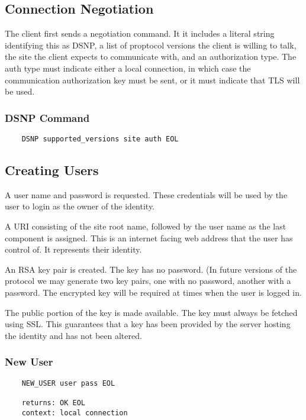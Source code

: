 \documentclass[letterpaper,11pt,oneside]{article}
\begin{document}
\subsection{Connection Negotiation}

The client first sends a negotiation command. It it includes a literal string
identifying this as DSNP, a list of proptocol versions the client is willing to
talk, the site the client expects to communicate with, and an authorization
type. The auth type must indicate either a local connection, in which case the
communication authorization key must be sent, or it must indicate that TLS will
be used.

\subsubsection{DSNP Command}

\vspace{10pt}
\begin{verbatim}
    DSNP supported_versions site auth EOL
\end{verbatim}

\subsection{Creating Users}

\vspace{10pt}
A user name and password is requested. These credentials will be used by the
user to login as the owner of the identity.

A URI consisting of the site root name, followed by the user name as the last
component is assigned. This is an internet facing web address that the user has
control of. It represents their identity.

An RSA key pair is created. The key has no password. (In future versions of the
protocol we may generate two key pairs, one with no password,  another with a
password. The encrypted key will be required at times when the user is logged
in.

The public portion of the key is made available. The key must always be fetched
using SSL. This guarantees that a key has been provided by the server hosting
the identity and has not been altered.

\subsubsection{New User}

\vspace{10pt}
\begin{verbatim}
    NEW_USER user pass EOL

    returns: OK EOL
    context: local connection
\end{verbatim}
\end{document}
